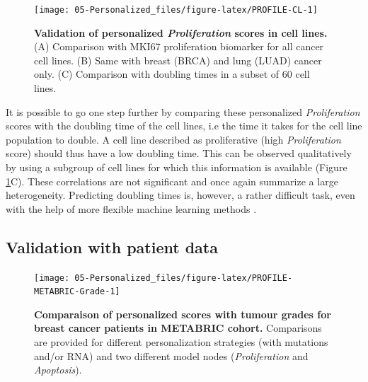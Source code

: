 \documentclass[a4paper,12pt,twoside,onecolumn,openright,final,oldfontcommands]{memoir}
\begin{document}
\begin{figure}

{\centering \texttt{[image: 05-Personalized\_files/figure-latex/PROFILE-CL-1]} 

}

\caption[Validation of personalized *Proliferation* scores in cell lines]{\textbf{Validation of personalized
\emph{Proliferation} scores in cell lines.} (A) Comparison with MKI67
proliferation biomarker for all cancer cell lines. (B) Same with breast
(BRCA) and lung (LUAD) cancer only. (C) Comparison with doubling times
in a subset of 60 cell lines.}\label{fig:PROFILE-CL}
\end{figure}







It is possible to go one step further by comparing these personalized
\emph{Proliferation} scores with the doubling time of the cell lines,
i.e the time it takes for the cell line population to double. A cell
line described as proliferative (high \emph{Proliferation} score) should
thus have a low doubling time. This can be observed qualitatively by
using a subgroup of cell lines for which this information is available
(Figure \ref{fig:PROFILE-CL}C). These correlations are not significant
and once again summarize a large heterogeneity. Predicting doubling
times is, however, a rather difficult task, even with the help of more
flexible machine learning methods \citep{kurilov2020assessment}.

\subsection{Validation with patient
data}\label{validation-with-patient-data}

\begin{figure}

{\centering \texttt{[image: 05-Personalized\_files/figure-latex/PROFILE-METABRIC-Grade-1]} 

}

\caption[Prognostic value of *Proliferation* scores for breast cancer patients in METABRIC cohort]{\textbf{Comparaison of personalized
scores with tumour grades for breast cancer patients in METABRIC
cohort.} Comparisons are provided for different personalization
strategies (with mutations and/or RNA) and two different model nodes
(\emph{Proliferation} and \emph{Apoptosis}).}\label{fig:PROFILE-METABRIC-Grade}
\end{figure}
\end{document}
